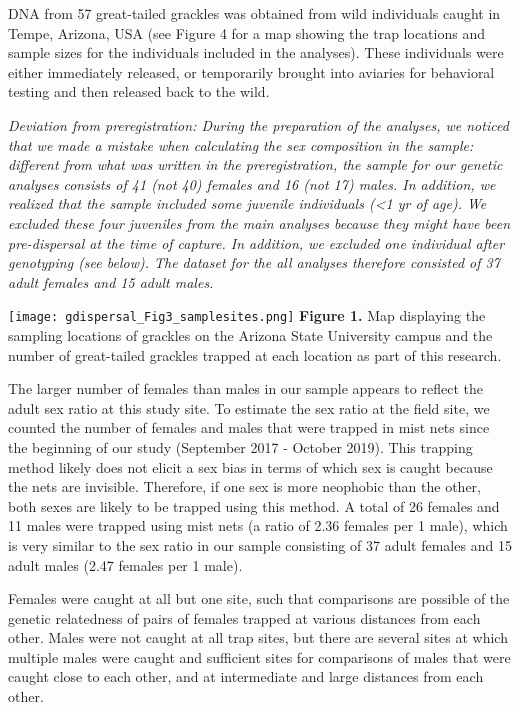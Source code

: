 \documentclass[
]{article}
\begin{document}
DNA from 57 great-tailed grackles was obtained from wild individuals
caught in Tempe, Arizona, USA (see Figure 4 for a map showing the trap
locations and sample sizes for the individuals included in the
analyses). These individuals were either immediately released, or
temporarily brought into aviaries for behavioral testing and then
released back to the wild.

\emph{Deviation from preregistration: During the preparation of the
analyses, we noticed that we made a mistake when calculating the sex
composition in the sample: different from what was written in the
preregistration, the sample for our genetic analyses consists of 41 (not
40) females and 16 (not 17) males. In addition, we realized that the
sample included some juvenile individuals (\textless1 yr of age). We
excluded these four juveniles from the main analyses because they might
have been pre-dispersal at the time of capture. In addition, we excluded
one individual after genotyping (see below). The dataset for the all
analyses therefore consisted of 37 adult females and 15 adult males.}

\texttt{[image: gdispersal\_Fig3\_samplesites.png]} \textbf{Figure 1.} Map
displaying the sampling locations of grackles on the Arizona State
University campus and the number of great-tailed grackles trapped at
each location as part of this research.

The larger number of females than males in our sample appears to reflect
the adult sex ratio at this study site. To estimate the sex ratio at the
field site, we counted the number of females and males that were trapped
in mist nets since the beginning of our study (September 2017 - October
2019). This trapping method likely does not elicit a sex bias in terms
of which sex is caught because the nets are invisible. Therefore, if one
sex is more neophobic than the other, both sexes are likely to be
trapped using this method. A total of 26 females and 11 males were
trapped using mist nets (a ratio of 2.36 females per 1 male), which is
very similar to the sex ratio in our sample consisting of 37 adult
females and 15 adult males (2.47 females per 1 male).

Females were caught at all but one site, such that comparisons are
possible of the genetic relatedness of pairs of females trapped at
various distances from each other. Males were not caught at all trap
sites, but there are several sites at which multiple males were caught
and sufficient sites for comparisons of males that were caught close to
each other, and at intermediate and large distances from each other.
\end{document}
